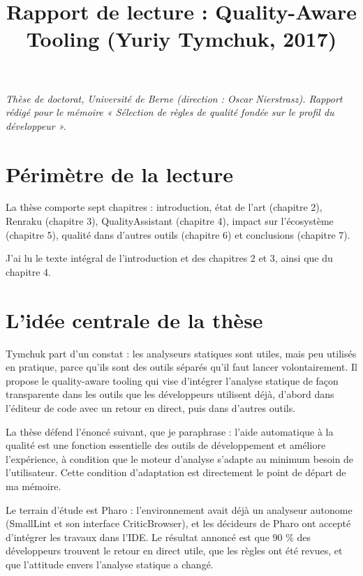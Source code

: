 \documentclass[11pt,a4paper]{article}
\begin{document}
\title{Rapport de lecture : Quality-Aware Tooling (Yuriy Tymchuk, 2017)}
\date{}
\maketitle

\begin{center}\emph{Thèse de doctorat, Université de Berne (direction : Oscar Nierstrasz). Rapport rédigé pour le mémoire « Sélection de règles de qualité fondée sur le profil du développeur ».}\end{center}

\section{Périmètre de la lecture}

La thèse comporte sept chapitres : introduction, état de l’art (chapitre 2), Renraku (chapitre 3), QualityAssistant (chapitre 4), impact sur l’écosystème (chapitre 5), qualité dans d’autres outils (chapitre 6) et conclusions (chapitre 7).

J’ai lu le texte intégral de l’introduction et des chapitres 2 et 3, ainsi que du chapitre 4.

\section{L’idée centrale de la thèse}

Tymchuk part d’un constat : les analyseurs statiques sont utiles, mais peu utilisés en pratique, parce qu’ils sont des outils séparés qu’il faut lancer volontairement. Il propose le quality-aware tooling qui vise d’intégrer l’analyse statique de façon transparente dans les outils que les développeurs utilisent déjà, d’abord dans l’éditeur de code avec un retour en direct, puis dans d’autres outils.

La thèse défend l’énoncé suivant, que je paraphrase : l’aide automatique à la qualité est une fonction essentielle des outils de développement et améliore l’expérience, à condition que le moteur d’analyse s’adapte au minimum besoin de l’utilisateur. Cette condition d’adaptation est directement le point de départ de ma mémoire.

Le terrain d’étude est Pharo : l’environnement avait déjà un analyseur autonome (SmallLint et son interface CriticBrowser), et les décideurs de Pharo ont accepté d’intégrer les travaux dans l’IDE. Le résultat annoncé est que 90 \% des développeurs trouvent le retour en direct utile, que les règles ont été revues, et que l’attitude envers l’analyse statique a changé.
\end{document}

